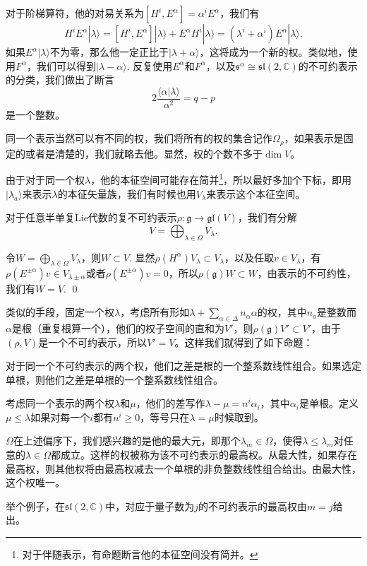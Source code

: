 \documentclass[9pt]{extarticle}
\newcommand{\cc}{\mathbb{C}}
\newcommand{\lag}{{\mathfrak{g}}}
\begin{document}
对于阶梯算符，他的对易关系为$[H^i,E^\alpha]=\alpha^iE^\alpha$，我们有
\[
	H^iE^\alpha|\lambda\rangle=[H^i,E^\alpha]|\lambda\rangle+E^\alpha H^i|\lambda\rangle=(\lambda^i+\alpha^i)E^\alpha |\lambda\rangle.
\]
如果$E^\alpha |\lambda\rangle$不为零，那么他一定正比于$|\lambda+\alpha\rangle$，这将成为一个新的权。类似地，使用$F^\alpha$，我们可以得到$|\lambda-\alpha\rangle$. 反复使用$E^\alpha$和$F^\alpha$，以及$\mathfrak{s}^\alpha\cong \mathfrak{sl}(2,\cc)$的不可约表示的分类，我们做出了断言
\[
	2\frac{\langle\alpha|\lambda\rangle}{\alpha^2}=q-p
\]
是一个整数。

同一个表示当然可以有不同的权，我们将所有的权的集合记作$\Omega_\rho$，如果表示是固定的或者是清楚的，我们就略去他。显然，权的个数不多于$\dim V$。

\para 由于对于同一个权$\lambda$，他的本征空间可能存在简并\footnote{对于伴随表示，有命题断言他的本征空间没有简并。}，所以最好多加个下标，即用$|\lambda_a\rangle$来表示$\lambda$的本征矢量族，我们有时候也用$V_{\lambda}$来表示这个本征空间。

\pro 对于任意半单复Lie代数的复不可约表示$\rho:\lag\to \mathfrak{gl}(V)$，我们有分解
\[
	V=\bigoplus_{\lambda\in\Omega} V_\lambda.
\]

\proof 令$W=\bigoplus_{\lambda\in\Omega} V_\lambda$，则$W\subset V$. 显然$\rho(H^\alpha)V_\lambda\subset V_\lambda$，以及任取$v\in V_\lambda$，有$\rho(E^{\pm\alpha})v \in V_{\lambda\pm\alpha}$或者$\rho(E^{\pm\alpha})v=0$，所以$\rho(\lag)W\subset W$，由表示的不可约性，我们有$W=V$. \qed

类似的手段，固定一个权$\lambda$，考虑所有形如$\lambda+\sum_{\alpha\in\Delta} n_\alpha\alpha$的权，其中$n_a$是整数而$\alpha$是根（重复根算一个），他们的权子空间的直和为$V'$，则$\rho(\lag)V'\subset V'$，由于$(\rho,V)$是一个不可约表示，所以$V'=V$。这样我们就得到了如下命题：

\pro 对于同一个不可约表示的两个权，他们之差是根的一个整系数线性组合。如果选定单根，则他们之差是单根的一个整系数线性组合。

\para 考虑同一个表示的两个权$\lambda$和$\mu$，他们的差写作$\lambda-\mu=n^i \alpha_i$，其中$\alpha_i$是单根。定义$\mu \leq \lambda$如果对每一个$i$都有$n^i\geq 0$，等号只在$\lambda=\mu$时候取到。

$\Omega$在上述偏序下，我们感兴趣的是他的最大元，即那个$\lambda_m\in \Omega$，使得$\lambda\leq \lambda_m$对任意的$\lambda\in \Omega$都成立。这样的权被称为该不可约表示的最高权。从最大性，如果存在最高权，则其他权将由最高权减去一个单根的非负整数线性组合给出。由最大性，这个权唯一。

举个例子，在$\mathfrak{sl}(2,\cc)$中，对应于量子数为$j$的不可约表示的最高权由$m=j$给出。
\end{document}
